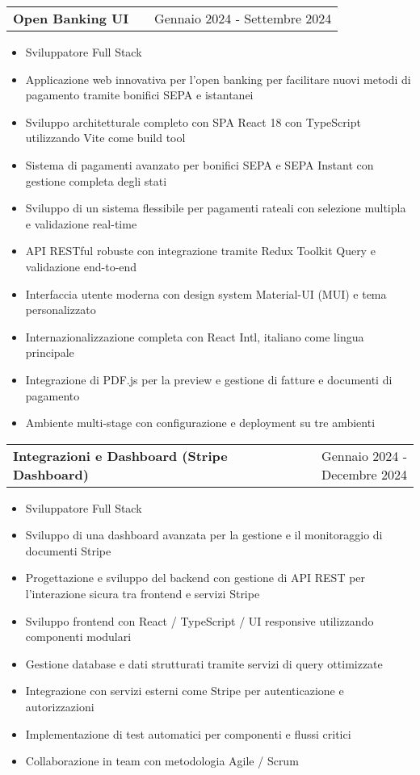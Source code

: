 \documentclass[a4paper,12pt]{article}
\makeatletter
\newenvironment{joblong}[2]
    {
    \begin{tabularx}{\linewidth}{@{}l X r@{}}
    \textbf{#1} & \hfill &  #2 \\[3.75pt]
    \end{tabularx}
    \begin{minipage}[t]{\linewidth}
    \begin{itemize}[nosep,after=\strut, leftmargin=1em, itemsep=3pt,label=--]
    }
    {
    \end{itemize}
    \end{minipage}    
    }
\makeatother
\begin{document}
\begin{joblong}{Open Banking UI}{Gennaio 2024 - Settembre 2024}
\item Sviluppatore Full Stack
\item Applicazione web innovativa per l'open banking per facilitare nuovi metodi di pagamento tramite bonifici SEPA e istantanei
\item Sviluppo architetturale completo con SPA React 18 con TypeScript utilizzando Vite come build tool
\item Sistema di pagamenti avanzato per bonifici SEPA e SEPA Instant con gestione completa degli stati
\item Sviluppo di un sistema flessibile per pagamenti rateali con selezione multipla e validazione real-time
\item API RESTful robuste con integrazione tramite Redux Toolkit Query e validazione end-to-end
\item Interfaccia utente moderna con design system Material-UI (MUI) e tema personalizzato
\item Internazionalizzazione completa con React Intl, italiano come lingua principale
\item Integrazione di PDF.js per la preview e gestione di fatture e documenti di pagamento
\item Ambiente multi-stage con configurazione e deployment su tre ambienti
\end{joblong}

\begin{joblong}{Integrazioni e Dashboard (Stripe Dashboard)}{Gennaio 2024 - Decembre 2024}
\item Sviluppatore Full Stack
\item Sviluppo di una dashboard avanzata per la gestione e il monitoraggio di documenti Stripe
\item Progettazione e sviluppo del backend con gestione di API REST per l'interazione sicura tra frontend e servizi Stripe
\item Sviluppo frontend con React / TypeScript / UI responsive utilizzando componenti modulari
\item Gestione database e dati strutturati tramite servizi di query ottimizzate
\item Integrazione con servizi esterni come Stripe per autenticazione e autorizzazioni
\item Implementazione di test automatici per componenti e flussi critici
\item Collaborazione in team con metodologia Agile / Scrum
\end{joblong}
\end{document}

